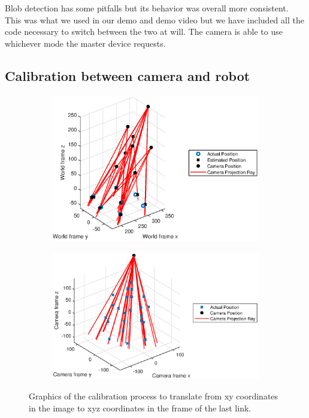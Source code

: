 \documentclass{article}
\begin{document}
Blob detection has some pitfalls but its behavior was overall more consistent. This was what we used in our demo and demo video but we have included all the code necessary to switch between the two at will. The camera is able to use whichever mode the master device requests.

\subsection{Calibration between camera and robot}
\begin{figure}[H]
	\centering
	\begin{subfigure}{.49\textwidth}
		\centering
		\includegraphics[keepaspectratio,width=\linewidth]{calibration1.eps}
	\end{subfigure}%
	\begin{subfigure}{.49\textwidth}
		\centering
		\includegraphics[keepaspectratio,width=\linewidth]{calibration2.eps}
	\end{subfigure}
	\caption{Graphics of the calibration process to translate from xy coordinates in the image to xyz coordinates in the frame of the last link.}
\end{figure}
\end{document}
